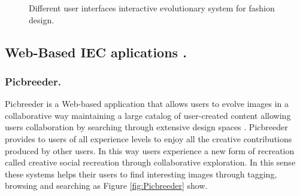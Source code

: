 \begin{figure}
\captionsetup{justification=centering,margin=2cm}
\centering
\setlength\fboxsep{0pt}
\setlength\fboxrule{0.7pt}
\caption{Different user interfaces interactive evolutionary system for fashion design.}
\label{fig:fashion}
\end{figure}

\subsection{Web-Based IEC aplications .}


\subsubsection{Picbreeder.}
Picbreeder is a Web-based application that allows users to evolve images in a
collaborative way maintaining a large catalog of user-created content allowing
users collaboration by searching through extensive design spaces
\cite{secretan2008picbreeder}. Picbreeder provides to users of all
experience levels to enjoy all the creative contributions produced by other
users. In this way users experience a new form of recreation called creative
social recreation through collaborative exploration. In this sense these systems
helps their users to find interesting images through tagging, browsing and
searching as Figure  \ref{fig:Picbreeder} show.

